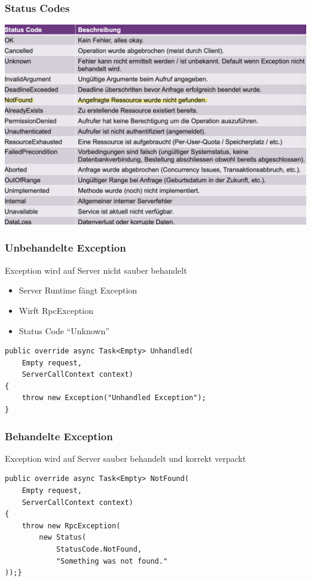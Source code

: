 \subsubsection{Status Codes}
\begin{center}
    \includegraphics[scale=.3]{graphic/gprc/Status Codes.png}
\end{center}
\vspace{-8pt}

\subsubsection{Unbehandelte Exception}
Exception wird auf Server nicht sauber behandelt
\begin{itemize}
    \item Server Runtime fängt Exception
    \item Wirft RpcException
    \item Status Code “Unknown”
\end{itemize}
\begin{lstlisting}
public override async Task<Empty> Unhandled(
    Empty request,
    ServerCallContext context)
{
    throw new Exception("Unhandled Exception");
}
\end{lstlisting}

\subsubsection{Behandelte Exception}
Exception wird auf Server sauber behandelt und korrekt verpackt
\begin{lstlisting}
public override async Task<Empty> NotFound(
    Empty request,
    ServerCallContext context)
{
    throw new RpcException(
        new Status(
            StatusCode.NotFound,
            "Something was not found."
));}
\end{lstlisting}


